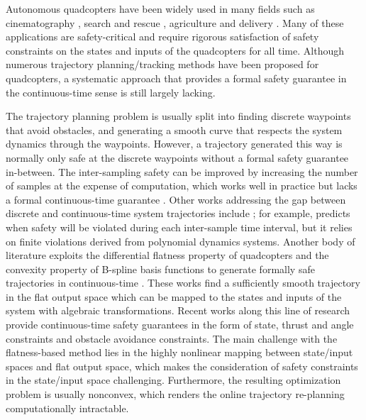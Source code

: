 \documentclass[journal,10pt]{IEEEtran}
\begin{document}
Autonomous quadcopters have been widely used in many fields such as cinematography \cite{cinema}, search and rescue \cite{ludovic2014rescue}, agriculture \cite{navia2016multispectral} and delivery \cite{tang2018aggressive}. Many of these applications are safety-critical and require rigorous satisfaction of safety constraints on the states and inputs of the quadcopters for all time. Although numerous trajectory planning/tracking methods have been proposed for quadcopters, a systematic approach that provides a formal safety guarantee in the continuous-time sense is still largely lacking.

The trajectory planning problem is usually split into finding discrete waypoints that avoid obstacles, and generating a smooth curve that respects the system dynamics through the waypoints. However, a trajectory generated this way is normally only safe at the discrete waypoints without a formal safety guarantee in-between. The inter-sampling safety can be improved by increasing the number of samples at the expense of computation, which works well in practice but lacks  a formal continuous-time guarantee \cite{Dontchev_2019,min_snap,polynomial}. Other works addressing the gap between discrete and continuous-time system trajectories include \cite{dueri_trajectory_2017,bonnans2017error,dontchev1981error}; for example, \cite{dueri_trajectory_2017} predicts when safety will be violated during each inter-sample time interval, but it relies on finite violations derived from polynomial dynamics systems.  Another body of literature exploits the differential flatness property of quadcopters and the convexity property of B-spline basis functions to generate formally safe trajectories in continuous-time \cite{Constrained_trajectory,Flat_trajectory_design,stoical2016obstacle,tang2021real}. These works find a sufficiently smooth trajectory in the flat output space which can be mapped to the states and inputs of the system with algebraic transformations. Recent works along this line of research provide continuous-time safety guarantees in the form of state, thrust and angle constraints \cite{Constrained_trajectory,Flat_trajectory_design} and obstacle avoidance \cite{stoical2016obstacle,tang2021real} constraints.  The main challenge with the flatness-based method lies in the highly nonlinear mapping between state/input spaces and flat output space, which makes the consideration of safety constraints in the state/input space challenging. Furthermore, the resulting optimization problem is usually nonconvex, which renders the online trajectory re-planning computationally intractable.
\end{document}
